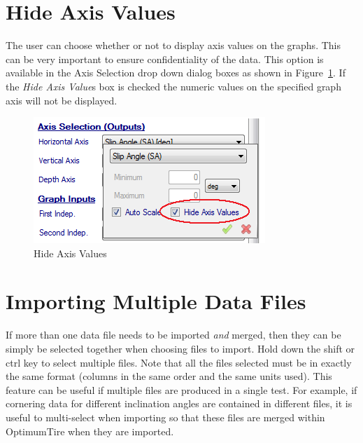 \section{Hide Axis Values}
\label{sec:HideAxisValues}
The user can choose whether or not to display axis values on the graphs. This can be very important to ensure confidentiality of the data. This option is available in the Axis Selection drop down dialog boxes as shown in Figure~\ref{fig:HideAxisValues}. If the \textsl{Hide Axis Value}s box is checked the numeric values on the specified graph axis will not be displayed. 

\begin{figure}[H]
	\centering
		\includegraphics{HideAxisValues.png}
	\caption{Hide Axis Values}
	\label{fig:HideAxisValues}
\end{figure}


\section{Importing Multiple Data Files}
\label{sec:ImportMultipleDataFiles}
If more than one data file needs to be imported \textsl{and} merged, then they can be simply be selected together when choosing files to import. Hold down the shift or ctrl key to select multiple files. Note that all the files selected must be in exactly the same format (columns in the same order and the same units used). This feature can be useful if multiple files are produced in a single test. For example, if cornering data for different inclination angles are contained in different files, it is useful to multi-select when importing so that these files are merged within OptimumTire when they are imported.

